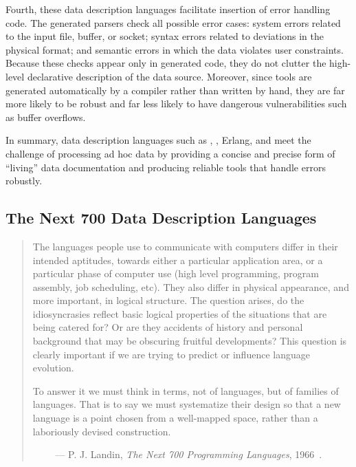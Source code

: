 Fourth, these data description languages 
facilitate insertion of error handling code. 
The generated parsers check all possible
error cases: system errors related to the input file, buffer, or
socket; syntax errors related to deviations in the physical format;
and semantic errors in which the data violates user
constraints. Because these checks appear only in generated code, they
do not clutter the high-level declarative description of the data
source. Moreover, since tools are generated automatically by a
compiler rather than written by hand, they are far more likely to be
robust and far less likely to have dangerous vulnerabilities such as
buffer overflows. 

In summary, data description languages such as \datascript{},
\packettypes{}, Erlang, and \pads{} meet the challenge of
processing ad hoc data by providing a concise and precise form of
``living'' data documentation and producing reliable tools that handle
errors robustly.


\subsection{The Next 700 Data Description Languages}

\begin {quote}
The languages people use to communicate with computers differ in their intended aptitudes, towards either a
particular application area, or a particular phase of computer use (high level programming, program assembly,
job scheduling, etc). They also differ in physical appearance, and more important, in logical structure. The question arises, do the idiosyncrasies reflect basic logical
properties of the situations that are being catered for?
Or are they accidents of history and personal background
that may be obscuring fruitful developments? This
question is clearly important if we are trying to predict or
influence language evolution.

To answer it we must think in terms, not of languages,
but of families of languages. That is to say we must
systematize their design so that a new language is a point
chosen from a well-mapped space, rather than a laboriously
devised construction.

$\qquad$ --- P. J. Landin, {\em The Next 700 Programming Languages}, 
1966~\cite{landin:700}.
\end{quote}


